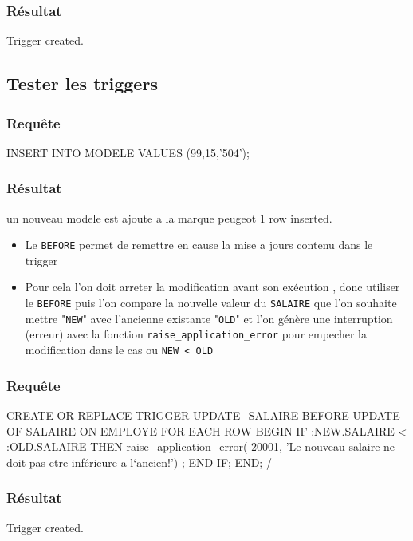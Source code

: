 \documentclass[•]{article}
\begin{document}
\subsubsection{Résultat}
\begin{sql}
Trigger created.
\end{sql}


\subsection{Tester les triggers}
\subsubsection{Requête}
\begin{sql}
INSERT INTO MODELE VALUES (99,15,'504');
\end{sql}


\subsubsection{Résultat}
\begin{sql}
un nouveau modele est ajoute a la marque peugeot
1 row inserted.
\end{sql}

\begin{itemize}
\item
Le \texttt{BEFORE} permet de remettre en cause la mise a jours contenu dans le trigger
\item
Pour cela l'on doit arreter la modification avant son exécution , donc utiliser le \texttt{BEFORE}
puis l'on compare la nouvelle valeur du \texttt{SALAIRE} que l'on souhaite mettre "\texttt{NEW}" avec l'ancienne existante "\texttt{OLD}"
et l'on génère une interruption (erreur) avec la fonction \texttt{raise\_application\_error} pour empecher la modification dans le cas ou
\texttt{NEW < OLD}
\end{itemize}

\subsubsection{Requête}
\begin{sql}
CREATE OR REPLACE TRIGGER UPDATE_SALAIRE
BEFORE UPDATE OF SALAIRE ON EMPLOYE 
FOR EACH ROW
BEGIN
	IF :NEW.SALAIRE < :OLD.SALAIRE
	THEN raise_application_error(-20001, 'Le nouveau salaire ne doit pas etre inférieure a l`ancien!') ;
	END IF;
END;
/ 
\end{sql}
\subsubsection{Résultat}
\begin{sql}
Trigger created.
\end{sql}
\end{document}

